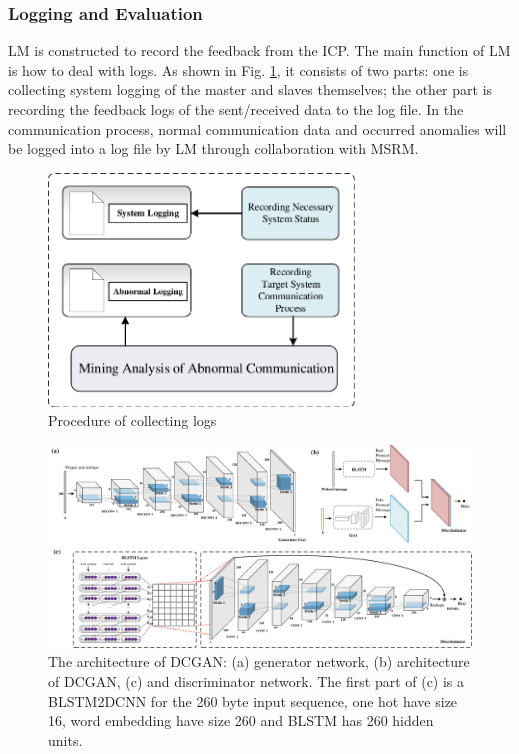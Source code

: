 \subsubsection{Logging and Evaluation}
LM is constructed to record the feedback from the ICP. The main function of LM is how to deal with logs. As shown in Fig. \ref{FigCollectingLogs}, it consists of two parts: one is collecting system logging of the master and slaves themselves; the other part is recording the feedback logs of the sent/received data to the log file. In the communication process, normal communication data and occurred anomalies will be logged into a log file by LM through collaboration with MSRM.
\begin{figure}[htbp]   %
	\centering 
	\includegraphics[width=3.2in]{FIGURE_LV/FigCollectingLogs.pdf}
	\caption{Procedure of collecting logs}
	\label{FigCollectingLogs}
\end{figure}

\begin{figure}[htbp] 		 %
	\centering
	\includegraphics[width=7in]{FIGURE_LV/FigModelArchitecture.pdf}
	\caption{The architecture of DCGAN: (a) generator network, (b) architecture of DCGAN, (c) and discriminator network. The first part of (c) is a BLSTM2DCNN for the 260 byte input sequence, one hot have size 16, word embedding have size 260 and BLSTM has 260 hidden units. }
	\label{FigModelArchitecture}
\end{figure} 